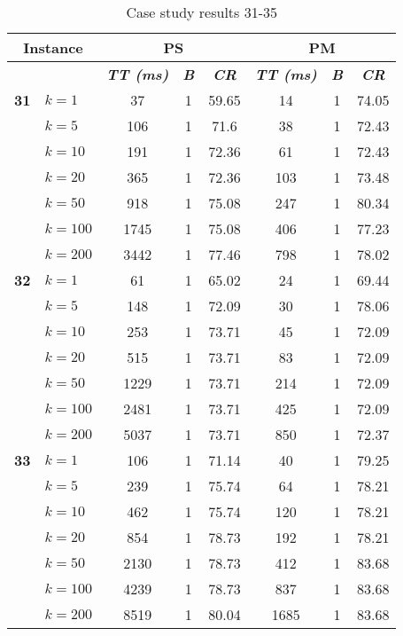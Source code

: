     \begin{table}[htbp]
    \caption{Case study results 31-35}
    \centering
    \begin{tabular}{|l|l|c|c|c|c|c|c|}
    \hline
    \multicolumn{ 2}{|c|}{\textbf{Instance}} & \multicolumn{ 3}{c|}{\textbf{PS}} & \multicolumn{ 3}{c|}{\textbf{PM}} \\ \hline
    \multicolumn{ 2}{|l|}{} & \textbf{\textit{TT (ms)}} & \textbf{\textit{B}} & \textbf{\textit{CR}} & \textbf{\textit{TT (ms)}} & \textbf{\textit{B}} & \textbf{\textit{CR}} \\ \hline
    \multicolumn{1}{|r|}{\textbf{31}} & $k=1$ & 37 & 1 & 59.65 & 14 & 1 & 74.05 \\ 
     & $k=5$ & 106 & 1 & 71.6 & 38 & 1 & 72.43 \\ 
     & $k=10$ & 191 & 1 & 72.36 & 61 & 1 & 72.43 \\ 
     & $k=20$ & 365 & 1 & 72.36 & 103 & 1 & 73.48 \\ 
     & $k=50$ & 918 & 1 & 75.08 & 247 & 1 & 80.34 \\ 
     & $k=100$ & 1745 & 1 & 75.08 & 406 & 1 & 77.23 \\ 
     & $k=200$ & 3442 & 1 & 77.46 & 798 & 1 & 78.02 \\ \hline
    \multicolumn{1}{|r|}{\textbf{32}} & $k=1$ & 61 & 1 & 65.02 & 24 & 1 & 69.44 \\ 
     & $k=5$ & 148 & 1 & 72.09 & 30 & 1 & 78.06 \\ 
     & $k=10$ & 253 & 1 & 73.71 & 45 & 1 & 72.09 \\ 
     & $k=20$ & 515 & 1 & 73.71 & 83 & 1 & 72.09 \\ 
     & $k=50$ & 1229 & 1 & 73.71 & 214 & 1 & 72.09 \\ 
     & $k=100$ & 2481 & 1 & 73.71 & 425 & 1 & 72.09 \\ 
     & $k=200$ & 5037 & 1 & 73.71 & 850 & 1 & 72.37 \\ \hline
    \multicolumn{1}{|r|}{\textbf{33}} & $k=1$ & 106 & 1 & 71.14 & 40 & 1 & 79.25 \\ 
     & $k=5$ & 239 & 1 & 75.74 & 64 & 1 & 78.21 \\ 
     & $k=10$ & 462 & 1 & 75.74 & 120 & 1 & 78.21 \\ 
     & $k=20$ & 854 & 1 & 78.73 & 192 & 1 & 78.21 \\ 
     & $k=50$ & 2130 & 1 & 78.73 & 412 & 1 & 83.68 \\ 
     & $k=100$ & 4239 & 1 & 78.73 & 837 & 1 & 83.68 \\ 
     & $k=200$ & 8519 & 1 & 80.04 & 1685 & 1 & 83.68 \\ \hline

\end{tabular}
\end{table}
